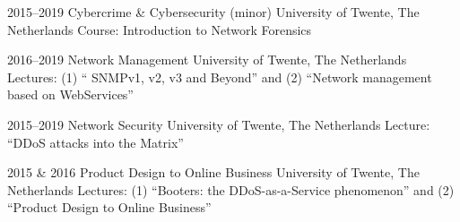 \documentclass[print]{styles/friggeri-cv-mac} %
\begin{document}

\begin{entrylist}
\entry
{2015--2019}
{Cybercrime \& Cybersecurity (minor)}
{University of Twente, The Netherlands}
{Course: Introduction to Network Forensics\\
	} 

\entry
{2016--2019}
{Network Management}
{University of Twente, The Netherlands}
{Lectures: (1) `` SNMPv1, v2, v3 and Beyond'' and (2) ``Network management based
	on WebServices''\\
}


\entry
{2015--2019}
{Network Security}
{University of Twente, The Netherlands}
{Lecture: ``DDoS attacks into the Matrix''\\
}

\entry
{2015 \& 2016}
{Product Design to Online Business}
{University of Twente, The Netherlands}
{Lectures: (1) ``Booters: the DDoS-as-a-Service phenomenon'' and (2) ``Product
	Design to Online Business''
	}

\end{entrylist}
\end{document}
